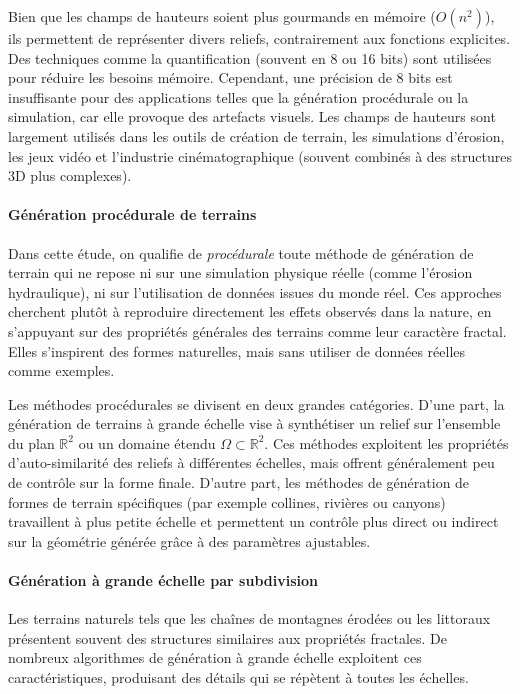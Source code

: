 Bien que les champs de hauteurs soient plus gourmands en mémoire ($O(n^2)$), ils permettent de représenter divers reliefs, contrairement aux fonctions explicites. Des techniques comme la quantification (souvent en 8 ou 16 bits) sont utilisées pour réduire les besoins mémoire. Cependant, une précision de 8 bits est insuffisante pour des applications telles que la génération procédurale ou la simulation, car elle provoque des artefacts visuels. Les champs de hauteurs sont largement utilisés dans les outils de création de terrain, les simulations d’érosion, les jeux vidéo et l’industrie cinématographique (souvent combinés à des structures 3D plus complexes).

\paragraph{Génération procédurale de terrains}

Dans cette étude, on qualifie de \textit{procédurale} toute méthode de génération de terrain qui ne repose ni sur une simulation physique réelle (comme l’érosion hydraulique), ni sur l’utilisation de données issues du monde réel. Ces approches cherchent plutôt à reproduire directement les effets observés dans la nature, en s’appuyant sur des propriétés générales des terrains comme leur caractère fractal. Elles s’inspirent des formes naturelles, mais sans utiliser de données réelles comme exemples.

Les méthodes procédurales se divisent en deux grandes catégories. D’une part, la génération de terrains à grande échelle vise à synthétiser un relief sur l’ensemble du plan $\mathbb{R}^2$ ou un domaine étendu $\Omega \subset \mathbb{R}^2$. Ces méthodes exploitent les propriétés d’auto-similarité des reliefs à différentes échelles, mais offrent généralement peu de contrôle sur la forme finale. D’autre part, les méthodes de génération de formes de terrain spécifiques (par exemple collines, rivières ou canyons) travaillent à plus petite échelle et permettent un contrôle plus direct ou indirect sur la géométrie générée grâce à des paramètres ajustables.

\newpage

\paragraph{Génération à grande échelle par subdivision}

Les terrains naturels tels que les chaînes de montagnes érodées ou les littoraux présentent souvent des structures similaires aux propriétés fractales. De nombreux algorithmes de génération à grande échelle exploitent ces caractéristiques, produisant des détails qui se répètent à toutes les échelles.

